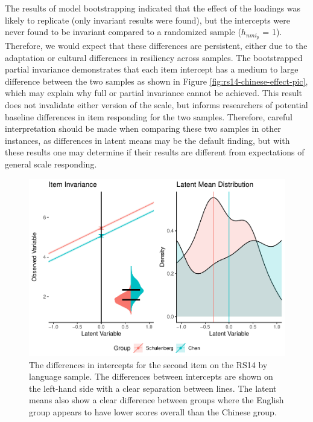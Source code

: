\documentclass[
  man]{apa7}
\begin{document}
The results of model bootstrapping indicated that the effect of the loadings was likely to replicate (only invariant results were found), but the intercepts were never found to be invariant compared to a randomized sample (\(h_{nmi_p}\) = 1). Therefore, we would expect that these differences are persistent, either due to the adaptation or cultural differences in resiliency across samples. The bootstrapped partial invariance demonstrates that each item intercept has a medium to large difference between the two samples as shown in Figure \ref{fig:rs14-chinese-effect-pic}, which may explain why full or partial invariance cannot be achieved. This result does not invalidate either version of the scale, but informs researchers of potential baseline differences in item responding for the two samples. Therefore, careful interpretation should be made when comparing these two samples in other instances, as differences in latent means may be the default finding, but with these results one may determine if their results are different from expectations of general scale responding.

\begin{figure}
\centering
\includegraphics{manuscript_files/figure-latex/rs14-chinese-pic-1.pdf}
\caption{\label{fig:rs14-chinese-pic}The differences in intercepts for the second item on the RS14 by language sample. The differences between intercepts are shown on the left-hand side with a clear separation between lines. The latent means also show a clear difference between groups where the English group appears to have lower scores overall than the Chinese group.}
\end{figure}
\end{document}

